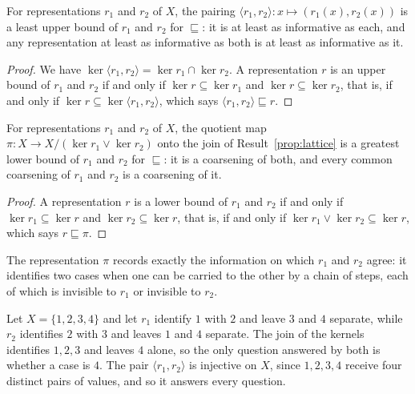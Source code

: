 \begin{established}\label{prop:joint-rep}
For representations $r_1$ and $r_2$ of $X$, the pairing $\langle r_1,r_2\rangle:x\mapsto(r_1(x),r_2(x))$ is a least upper bound of $r_1$ and $r_2$ for $\sqsubseteq$: it is at least as informative as each, and any representation at least as informative as both is at least as informative as it.
\end{established}
\begin{proof}
We have $\ker\langle r_1,r_2\rangle=\ker r_1\cap\ker r_2$. A representation $r$ is an upper bound of $r_1$ and $r_2$ if and only if $\ker r\subseteq\ker r_1$ and $\ker r\subseteq\ker r_2$, that is, if and only if $\ker r\subseteq\ker\langle r_1,r_2\rangle$, which says $\langle r_1,r_2\rangle\sqsubseteq r$.
\end{proof}

\begin{established}\label{prop:common-coarsening}
For representations $r_1$ and $r_2$ of $X$, the quotient map $\pi:X\to X/{(\ker r_1\vee\ker r_2)}$ onto the join of Result~\ref{prop:lattice} is a greatest lower bound of $r_1$ and $r_2$ for $\sqsubseteq$: it is a coarsening of both, and every common coarsening of $r_1$ and $r_2$ is a coarsening of it.
\end{established}
\begin{proof}
A representation $r$ is a lower bound of $r_1$ and $r_2$ if and only if $\ker r_1\subseteq\ker r$ and $\ker r_2\subseteq\ker r$, that is, if and only if $\ker r_1\vee\ker r_2\subseteq\ker r$, which says $r\sqsubseteq\pi$.
\end{proof}

The representation $\pi$ records exactly the information on which $r_1$ and $r_2$ agree: it identifies two cases when one can be carried to the other by a chain of steps, each of which is invisible to $r_1$ or invisible to $r_2$.

\begin{example}
Let $X=\{1,2,3,4\}$ and let $r_1$ identify $1$ with $2$ and leave $3$ and $4$ separate, while $r_2$ identifies $2$ with $3$ and leaves $1$ and $4$ separate. The join of the kernels identifies $1,2,3$ and leaves $4$ alone, so the only question answered by both is whether a case is $4$. The pair $\langle r_1,r_2\rangle$ is injective on $X$, since $1,2,3,4$ receive four distinct pairs of values, and so it answers every question.
\end{example}

